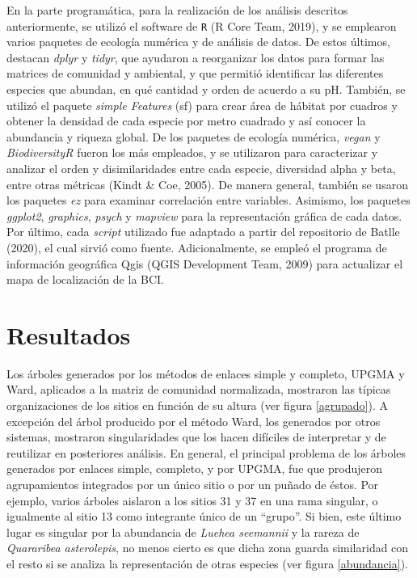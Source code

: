 \documentclass[11pt,]{article}
\begin{document}
En la parte programática, para la realización de los análisis descritos
anteriormente, se utilizó el software de \texttt{R} (R Core Team, 2019),
y se emplearon varios paquetes de ecología numérica y de análisis de
datos. De estos últimos, destacan \emph{dplyr} y \emph{tidyr}, que
ayudaron a reorganizar los datos para formar las matrices de comunidad y
ambiental, y que permitió identificar las diferentes especies que
abundan, en qué cantidad y orden de acuerdo a su pH. También, se utilizó
el paquete \emph{simple Features} (sf) para crear área de hábitat por
cuadros y obtener la densidad de cada especie por metro cuadrado y así
conocer la abundancia y riqueza global. De los paquetes de ecología
numérica, \emph{vegan} y \emph{BiodiversityR} fueron los más empleados,
y se utilizaron para caracterizar y analizar el orden y disimilaridades
entre cada especie, diversidad alpha y beta, entre otras métricas (Kindt
\& Coe, 2005). De manera general, también se usaron los paquetes
\emph{ez} para examinar correlación entre variables. Asimismo, los
paquetes \emph{ggplot2}, \emph{graphics}, \emph{psych} y \emph{mapview}
para la representación gráfica de cada datos. Por último, cada
\emph{script} utilizado fue adaptado a partir del repositorio de Batlle
(2020), el cual sirvió como fuente. Adicionalmente, se empleó el
programa de información geográfica Qgis (QGIS Development Team, 2009)
para actualizar el mapa de localización de la BCI.

\section{Resultados}\label{resultados}

Los árboles generados por los métodos de enlaces simple y completo,
UPGMA y Ward, aplicados a la matriz de comunidad normalizada, mostraron
las típicas organizaciones de los sitios en función de su altura (ver
figura \ref{agrupado}). A excepción del árbol producido por el método
Ward, los generados por otros sistemas, mostraron singularidades que los
hacen difíciles de interpretar y de reutilizar en posteriores análisis.
En general, el principal problema de los árboles generados por enlaces
simple, completo, y por UPGMA, fue que produjeron agrupamientos
integrados por un único sitio o por un puñado de éstos. Por ejemplo,
varios árboles aislaron a los sitios 31 y 37 en una rama singular, o
igualmente al sitio 13 como integrante único de un ``grupo''. Si bien,
este último lugar es singular por la abundancia de \emph{Luehea
seemannii} y la rareza de \emph{Quararibea asterolepis}, no menos cierto
es que dicha zona guarda similaridad con el resto si se analiza la
representación de otras especies (ver figura \ref{abundancia}).
\end{document}
